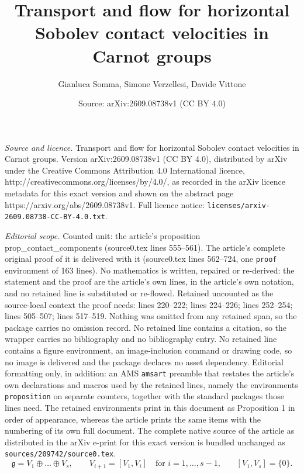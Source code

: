 \documentclass[10pt,a4paper]{amsart}
\title{Transport and flow for horizontal Sobolev contact velocities in Carnot groups}
\author{Gianluca Somma, Simone Verzellesi, Davide Vittone}
\date{Source: arXiv:2609.08738v1 (CC BY 4.0)}
\begin{document}
\maketitle

\noindent\emph{Source and licence.} Transport and flow for horizontal Sobolev contact velocities in Carnot groups. Version arXiv:2609.08738v1 (CC BY 4.0), distributed by arXiv under the Creative Commons Attribution 4.0 International licence, http://creativecommons.org/licenses/by/4.0/, as recorded in the arXiv licence metadata for this exact version and shown on the abstract page https://arxiv.org/abs/2609.08738v1. Full licence notice: \texttt{licenses/arxiv-2609.08738-CC-BY-4.0.txt}.\par\smallskip

\noindent\textit{Editorial scope.} Counted unit: the article's proposition prop\_contact\_components (source0.tex lines 555--561). The article's complete original proof of it is delivered with it (source0.tex lines 562--724, one \texttt{proof} environment of 163 lines). No mathematics is written, repaired or re-derived: the statement and the proof are the article's own lines, in the article's own notation, and no retained line is substituted or re-flowed.  Retained uncounted as the source-local context the proof needs: lines 220--222; lines 224--226; lines 252--254; lines 505--507; lines 517--519.  Nothing was omitted from any retained span, so the package carries no omission record.  No retained line contains a citation, so the wrapper carries no bibliography and no bibliography entry.  No retained line contains a figure environment, an image-inclusion command or drawing code, so no image is delivered and the package declares no asset dependency.  Editorial formatting only, in addition: an AMS \texttt{amsart} preamble that restates the article's own declarations and macros used by the retained lines, namely the environments \texttt{proposition} on separate counters, together with the standard packages those lines need.  The retained environments print in this document as Proposition 1 in order of appearance, whereas the article prints the same items with the numbering of its own full document.  The complete native source of the article as distributed in the arXiv e-print for this exact version is bundled unchanged as \texttt{sources/209742/source0.tex}.
\begin{equation}\label{defcarnotgroup}
\mathfrak{g}= V_1 \oplus \dots \oplus V_s, \qquad V_{i+1} = [V_1,V_i] \quad \text{for $i=1,\dots,s-1$,} \qquad [V_1,V_s]=\{0\}.
\end{equation}
\end{document}
